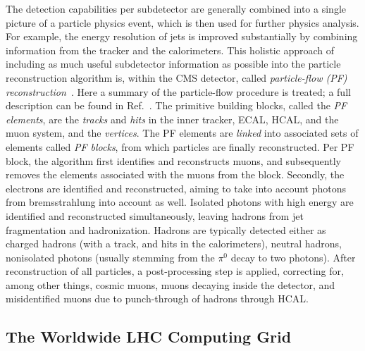 The detection capabilities per subdetector
are generally combined into a single picture of a particle physics event, which is then used for further physics analysis.
% 
% 
For example, the energy resolution of jets is improved substantially by combining information from the tracker and the calorimeters.
% 
This holistic approach of including as much useful subdetector information as possible into the particle reconstruction algorithm is, within the CMS detector, called \textit{particle-flow (PF) reconstruction}~\cite{Sirunyan:2017ulk}.
% 
Here a summary of the particle-flow procedure is treated; a full description can be found in Ref.~\cite{Sirunyan:2017ulk}.
% 
The primitive building blocks, called the \textit{PF elements}, are the \textit{tracks} and \textit{hits} in the inner tracker, ECAL, HCAL, and the muon system, and the \textit{vertices}.
% 
The PF elements are \textit{linked} into associated sets of elements called \textit{PF blocks}, from which particles are finally reconstructed.
% 
Per PF block, the algorithm first identifies and reconstructs muons, and subsequently removes the elements associated with the muons from the block.
% 
Secondly, the electrons are identified and reconstructed, aiming to take into account photons from bremsstrahlung into account as well.
% 
Isolated photons with high energy are identified and reconstructed simultaneously, leaving hadrons from jet fragmentation and hadronization.
% 
Hadrons are typically detected either as charged hadrons (with a track, and hits in the calorimeters), neutral hadrons, nonisolated photons (usually stemming from the $\pi^0$ decay to two photons).
% 
After reconstruction of all particles, a post-processing step is applied, correcting for, among other things, cosmic muons, muons decaying inside the detector, and misidentified muons due to punch-through of hadrons through HCAL.


\subsection{The Worldwide LHC Computing Grid}

